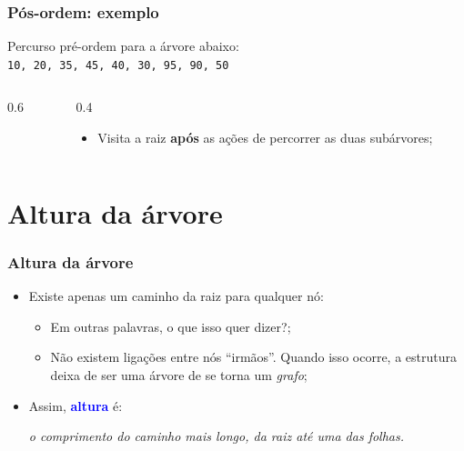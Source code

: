 \documentclass{beamer}
\newcommand{\tcb}[1]{\textcolor{blue}{\textbf{#1}}}
\begin{document}
\begin{frame}
  \frametitle{Pós-ordem: exemplo}

  Percurso pré-ordem para a árvore abaixo:\\
  \texttt{10, 20, 35, 45, 40, 30, 95, 90, 50}
  
  \vspace{1cm}

  \begin{columns}
    \begin{column}{0.6\textwidth}

      \centering
    \end{column}
    \begin{column}{0.4\textwidth}
      \begin{itemize}
        \item Visita a raiz \textbf{após} as ações de percorrer as duas subárvores;
      \end{itemize}
    \end{column}
  \end{columns}

\end{frame}

\section{Altura da árvore}

\begin{frame}
  \frametitle{Altura da árvore}

  \begin{itemize}
    \item Existe apenas um caminho da raiz para qualquer nó:
      \begin{itemize}
        \item Em outras palavras, o que isso quer dizer?;
        \pause
        \item Não existem ligações entre nós ``irmãos''. Quando isso ocorre,
              a estrutura deixa de ser uma árvore de se torna um \textit{grafo};
      \end{itemize}
    \pause
    \item Assim, \tcb{altura} é:

    \center \textit{o comprimento do caminho mais longo, da raiz até uma das folhas.}

  \end{itemize}
\end{frame}
\end{document}
